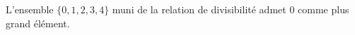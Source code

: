 L'ensemble $\{0,1,2,3,4\}$ muni de la relation de divisibilité admet $0$ comme plus grand élément.

\begin{reponses}
\end{reponses}

